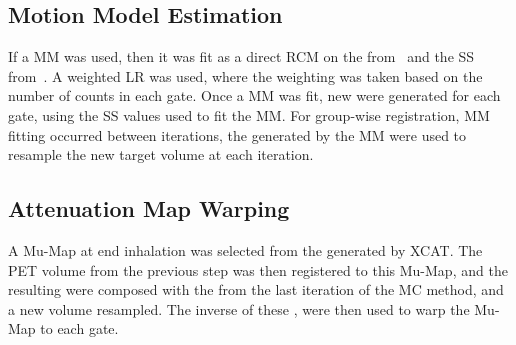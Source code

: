             \subsection{Motion Model Estimation} \label{sec:comparison_of_motion_correction_methods_incorporating_motion_modelling_for_pet/ct_using_a_single_breath_hold_attenuation_map_motion_model_estimation}
                If a \gls{MM} was used, then it was fit as a direct \gls{RCM} on the  from~ and the \gls{SS} from~. A weighted \gls{LR} was used, where the weighting was taken based on the number of counts in each gate. Once a \gls{MM} was fit, new  were generated for each gate, using the \gls{SS} values used to fit the \gls{MM}. For group-wise registration, \gls{MM} fitting occurred between iterations, the  generated by the \gls{MM} were used to resample the new target volume at each iteration.
            
            \subsection{Attenuation Map Warping} \label{sec:comparison_of_motion_correction_methods_incorporating_motion_modelling_for_pet/ct_using_a_single_breath_hold_attenuation_map_attenuation_map_warping}
                A \gls{Mu-Map} at end inhalation was selected from the  generated by \gls{XCAT}. The \gls{PET} volume from the previous step was then registered to this \gls{Mu-Map}, and the resulting  were composed with the  from the last iteration of the \gls{MC} method, and a new volume resampled. The inverse of these , were then used to warp the \gls{Mu-Map} to each gate.
            
